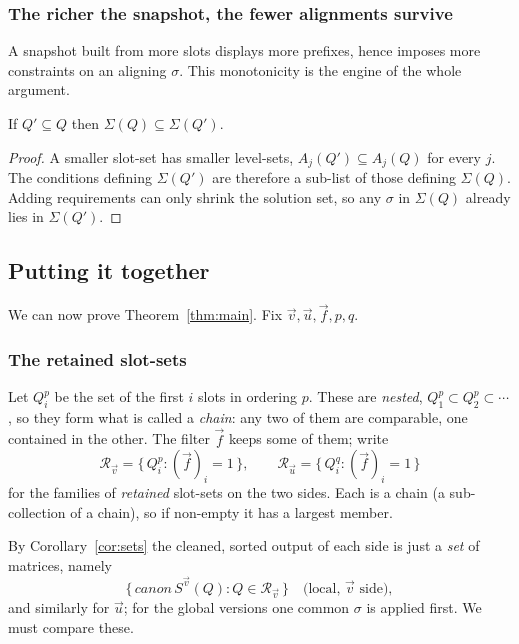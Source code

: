 \subsubsection*{The richer the snapshot, the fewer alignments survive}

A snapshot built from more slots displays more prefixes, hence imposes more
constraints on an aligning $\sigma$.  This monotonicity is the engine of the whole
argument.

\begin{corollary}[monotonicity]\label{cor:mono}
If $Q'\subseteq Q$ then $\Sigma(Q)\subseteq\Sigma(Q')$.
\end{corollary}

\begin{proof}
A smaller slot-set has smaller level-sets, $A_j(Q')\subseteq A_j(Q)$ for every $j$.
The conditions defining $\Sigma(Q')$ are therefore a sub-list of those defining
$\Sigma(Q)$.  Adding requirements can only shrink the solution set, so any
$\sigma$ in $\Sigma(Q)$ already lies in $\Sigma(Q')$.
\end{proof}


\subsection{Putting it together}
\label{sec:solution}

We can now prove Theorem~\ref{thm:main}.  Fix $\vec v,\vec u,\vec f,p,q$.

\subsubsection*{The retained slot-sets}

\label{def:retained}Let $Q^p_i$ be the set of the first $i$ slots in ordering $p$.  These are
\emph{nested}, $Q^p_1\subset Q^p_2\subset\cdots$, so they form what is called a
\emph{chain}: any two of them are comparable, one contained in the other.  The
filter $\vec f$ keeps some of them; write
\[
\mathcal R_{\vec v}=\{\,Q^p_i:(\vec f)_i=1\,\},
\qquad
\mathcal R_{\vec u}=\{\,Q^q_i:(\vec f)_i=1\,\}
\]
for the families of \emph{retained} slot-sets on the two sides.  Each is a chain
(a sub-collection of a chain), so if non-empty it has a largest member.

By Corollary~\ref{cor:sets} the cleaned, sorted output of each side is just a
\emph{set} of matrices, namely
\[
\{\,canon\,S^{\vec v}(Q):Q\in\mathcal R_{\vec v}\,\}
\quad\text{(local, $\vec v$ side)},
\]
and similarly for $\vec u$; for the global versions one common $\sigma$ is applied
first.  We must compare these.

